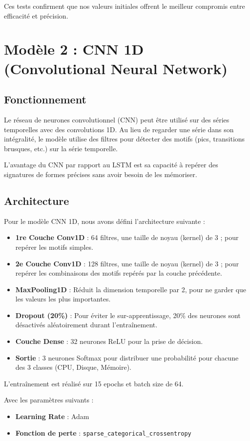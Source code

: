 \documentclass[12pt,a4paper]{report}
\begin{document}
Ces tests confirment que nos valeurs initiales offrent le meilleur compromis entre efficacité et précision.

\chapter{Modèle 2 : CNN 1D (Convolutional Neural Network)}

\section{Fonctionnement}
Le réseau de neurones convolutionnel (CNN) peut être utilisé sur des séries temporelles avec des convolutions 1D. Au lieu de regarder une série dans son intégralité, le modèle utilise des filtres pour détecter des motifs (pics, transitions brusques, etc.) sur la série temporelle. 

L'avantage du CNN par rapport au LSTM est sa capacité à repérer des signatures de formes précises sans avoir besoin de les mémoriser.

\section{Architecture}
Pour le modèle CNN 1D, nous avons défini l'architecture suivante :
\begin{itemize}
    \item \textbf{1re Couche Conv1D} : 64 filtres, une taille de noyau (kernel) de 3 ; pour repérer les motifs simples.
    \item \textbf{2e Couche Conv1D} : 128 filtres, une taille de noyau (kernel) de 3 ; pour repérer les combinaisons des motifs repérés par la couche précédente.
    \item \textbf{MaxPooling1D} : Réduit la dimension temporelle par 2, pour ne garder que les valeurs les plus importantes.
    \item \textbf{Dropout (20\%)} : Pour éviter le sur-apprentissage, 20\% des neurones sont désactivés aléatoirement durant l'entraînement.
    \item \textbf{Couche Dense} : 32 neurones ReLU pour la prise de décision.
    \item \textbf{Sortie} : 3 neurones Softmax pour distribuer une probabilité pour chacune des 3 classes (CPU, Disque, Mémoire).
\end{itemize}

L'entraînement est réalisé sur 15 epochs et batch size de 64.

Avec les paramètres suivants :
\begin{itemize}
    \item \textbf{Learning Rate} : Adam
    \item \textbf{Fonction de perte} : \texttt{sparse\_categorical\_crossentropy}
\end{itemize}
\end{document}
